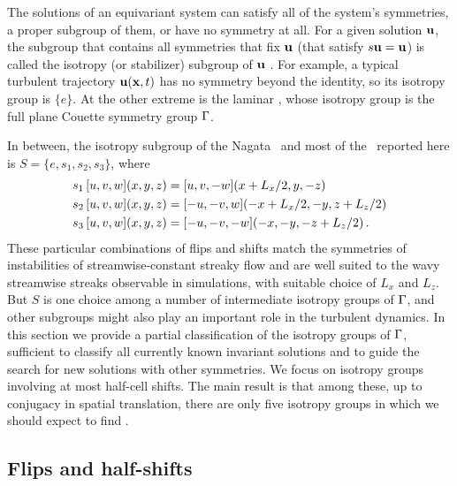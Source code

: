 The solutions of an equivariant system can satisfy all of
the system's symmetries, a proper subgroup of them, or
have no symmetry at all. For a given solution ${\bf u}$, the
subgroup that contains all symmetries that fix ${\bf u}$ (that satisfy
$s {\bf u} = {\bf u}$) is called the isotropy (or stabilizer) subgroup of ${\bf u}$%
. For example, a typical
turbulent trajectory ${\bf u}({\bf x},t)$ has no symmetry beyond the identity,
so its isotropy group is $\{e\}$. At the other extreme is the laminar
{\eqv}, whose isotropy group is the full plane Couette symmetry
group $\Gamma$.

In between, the isotropy subgroup  of the Nagata \eqva\ and most
of the \eqva\ reported here is $S = \{e, s_1, s_2, s_3\}$, where
\begin{align}
s_1 \, [u, v, w](x,y,z) &= [u, v, -w](x+L_x/2, y, -z) \nonumber \\
s_2 \, [u, v, w](x,y,z) &= [-u, -v, w](-x+L_x/2,-y,z+L_z/2) \label{shiftRot}\\
s_3 \, [u, v, w](x,y,z) &= [-u,-v,-w](-x, -y, -z+L_z/2) \nonumber
\,.
\end{align}
These particular combinations of flips and shifts match the symmetries
of instabilities of streamwise-constant streaky flow
and are well suited to the wavy streamwise streaks observable in
simulations, %
with suitable choice of $L_x$ and $L_z$.
But $S$ is one choice among a number of intermediate isotropy
groups of $\Gamma$, and other subgroups might also play an
important role in the turbulent dynamics. In this section we
provide a partial classification of the isotropy groups of $\Gamma$, sufficient
to classify all currently known invariant solutions and to guide
the search for new solutions with other symmetries. We focus on
isotropy groups involving at most half-cell shifts. The main result is
that among these, up to conjugacy in spatial translation, there
are only  five isotropy groups in which we should expect to find {\eqva}.

\subsection{Flips and half-shifts}
\label{s:flipnshift}

